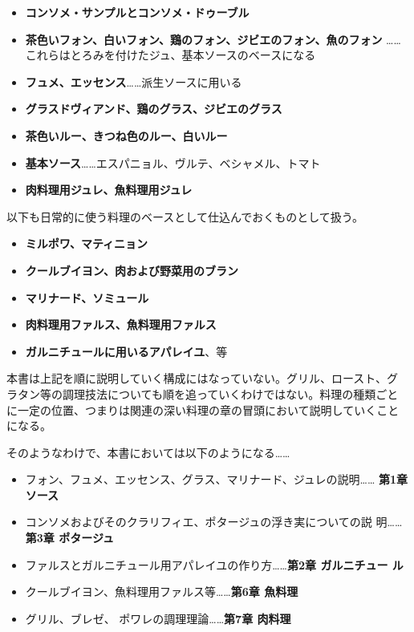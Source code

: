 \documentclass[twoside,12Q,b5j]{escoffierltjsbook}
\def\tightlist{\itemsep1pt\parskip0pt\parsep0pt}
\begin{document}
\begin{itemize}
\tightlist
\item
  \textbf{コンソメ・サンプルとコンソメ・ドゥーブル}
\item
  \textbf{茶色いフォン、白いフォン、鶏のフォン、ジビエのフォン、魚のフォン
  }\ldots{}\ldots{}これらはとろみを付けたジュ、基本ソースのベースになる
\item
  \textbf{フュメ、エッセンス}\ldots{}\ldots{}派生ソースに用いる
\item
  \textbf{グラスドヴィアンド、鶏のグラス、ジビエのグラス}
\item
  \textbf{茶色いルー、きつね色のルー、白いルー}
\item
  \textbf{基本ソース}\ldots{}\ldots{}エスパニョル、ヴルテ、ベシャメル、トマト
\item
  \textbf{肉料理用ジュレ、魚料理用ジュレ}
\end{itemize}

以下も日常的に使う料理のベースとして仕込んでおくものとして扱う。

\begin{itemize}
\tightlist
\item
  \textbf{ミルポワ、マティニョン}
\item
  \textbf{クールブイヨン、肉および野菜用のブラン}
\item
  \textbf{マリナード、ソミュール}
\item
  \textbf{肉料理用ファルス、魚料理用ファルス}
\item
  \textbf{ガルニチュールに用いるアパレイユ}、等
\end{itemize}

本書は上記を順に説明していく構成にはなっていない。グリル、ロースト、グ
ラタン等の調理技法についても順を追っていくわけではない。料理の種類ごと
に一定の位置、つまりは関連の深い料理の章の冒頭において説明していくこと
になる。

そのようなわけで、本書においては以下のようになる\ldots{}\ldots{}

\begin{itemize}
\tightlist
\item
  フォン、フュメ、エッセンス、グラス、マリナード、ジュレの説明\ldots{}\ldots{}
  \textbf{ 第1章 ソース}
\item
  コンソメおよびそのクラリフィエ、ポタージュの浮き実についての説
  明\ldots{}\ldots{}\textbf{第3章 ポタージュ}
\item
  ファルスとガルニチュール用アパレイユの作り方\ldots{}\ldots{}\textbf{第2章
  ガルニチュー ル}
\item
  クールブイヨン、魚料理用ファルス等\ldots{}\ldots{}\textbf{第6章
  魚料理}
\item
  グリル、ブレゼ、 ポワレの調理理論\ldots{}\ldots{}\textbf{第7章 肉料理}
\end{itemize}
\end{document}
